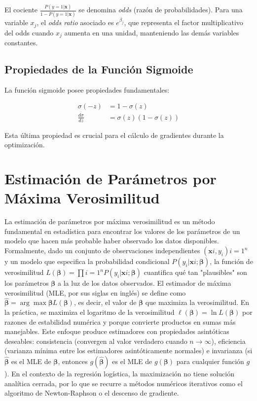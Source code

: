 \documentclass[12pt]{article}
\begin{document}
El cociente $\frac{P(y=1|\mathbf{x})}{1 - P(y=1|\mathbf{x})}$ se denomina \textit{odds} (razón de probabilidades). Para una variable $x_j$, el \textit{odds ratio} asociado es $e^{\beta_j}$, que representa el factor multiplicativo del odds cuando $x_j$ aumenta en una unidad, manteniendo las demás variables constantes.

\subsection{Propiedades de la Función Sigmoide}

La función sigmoide posee propiedades fundamentales:

\begin{align}
\sigma(-z) &= 1 - \sigma(z) \\
\frac{d\sigma}{dz} &= \sigma(z)(1 - \sigma(z))
\end{align}

Esta última propiedad es crucial para el cálculo de gradientes durante la optimización.

\section{Estimación de Parámetros por Máxima Verosimilitud}

La estimación de parámetros por máxima verosimilitud es un método fundamental en estadística para encontrar los valores de los parámetros de un modelo que hacen más probable haber observado los datos disponibles. Formalmente, dado un conjunto de observaciones independientes ${(\mathbf{x}i, y_i)}{i=1}^n$ y un modelo que especifica la probabilidad condicional $P(y_i|\mathbf{x}i; \boldsymbol{\beta})$, la función de verosimilitud $L(\boldsymbol{\beta}) = \prod{i=1}^n P(y_i|\mathbf{x}i; \boldsymbol{\beta})$ cuantifica qué tan "plausibles" son los parámetros $\boldsymbol{\beta}$ a la luz de los datos observados. El estimador de máxima verosimilitud (MLE, por sus siglas en inglés) se define como $\hat{\boldsymbol{\beta}} = \arg\max{\boldsymbol{\beta}} L(\boldsymbol{\beta})$, es decir, el valor de $\boldsymbol{\beta}$ que maximiza la verosimilitud. En la práctica, se maximiza el logaritmo de la verosimilitud $\ell(\boldsymbol{\beta}) = \ln L(\boldsymbol{\beta})$ por razones de estabilidad numérica y porque convierte productos en sumas más manejables. Este enfoque produce estimadores con propiedades asintóticas deseables: consistencia (convergen al valor verdadero cuando $n \to \infty$), eficiencia (varianza mínima entre los estimadores asintóticamente normales) e invarianza (si $\hat{\boldsymbol{\beta}}$ es el MLE de $\boldsymbol{\beta}$, entonces $g(\hat{\boldsymbol{\beta}})$ es el MLE de $g(\boldsymbol{\beta})$ para cualquier función $g$). En el contexto de la regresión logística, la maximización no tiene solución analítica cerrada, por lo que se recurre a métodos numéricos iterativos como el algoritmo de Newton-Raphson o el descenso de gradiente.
\end{document}
